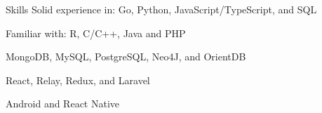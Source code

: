 
\prefix{}

\begin{rubric}{Skills}
	Solid experience in: Go, Python, JavaScript/TypeScript, and SQL
	\par Familiar with: R, C/C++, Java and PHP

	\entry*[Databases]
	MongoDB, MySQL, PostgreSQL, Neo4J, and OrientDB

	React, Relay, Redux, and Laravel

	Android and React Native

\end{rubric}

